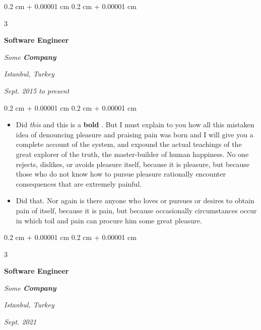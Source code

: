 \documentclass[10pt, letterpaper]{article}
\newenvironment{highlights}{
    \begin{itemize}[
        topsep=0.10 cm,
        parsep=0.10 cm,
        partopsep=0pt,
        itemsep=0pt,
        leftmargin=0.4 cm + 10pt + 0.6 cm
    ]
}{
    \end{itemize}
} %
\newenvironment{onecolentry}{
    \begin{adjustwidth}{
        0.2 cm + 0.00001 cm
    }{
        0.2 cm + 0.00001 cm
    }
}{
    \end{adjustwidth}
} %
\newenvironment{threecolentry}[3][]{
    \onecolentry
    \def\thirdColumn{#3}
    \setcolumnwidth{0.6 cm, \fill, 4.5 cm}
    \begin{paracol}{3}
    #2 \switchcolumn
}{
    \switchcolumn \raggedleft \thirdColumn
    \end{paracol}
    \endonecolentry
} %
\let\hrefWithoutArrow\href
\renewcommand{\href}[2]{\hrefWithoutArrow{#1}{\mbox{\ifthenelse{\equal{#2}{}}{ }{#2 }\raisebox{.15ex}{\footnotesize \faExternalLink*}}}}
\begin{document}
        \vspace{0.2 cm-3px}

        \begin{threecolentry}{
            \vspace*{\fill}
            \textbullet
            \vspace*{3px}
            \vspace*{\fill}
        }{
        \textit{Istanbul, Turkey}    
            
        \textit{Sept. 2015 to present}}
            \textbf{Software Engineer}
            
            \textit{Some \textbf{Company}}
        \end{threecolentry}

        \vspace{0.10 cm-3px}
        \begin{onecolentry}
            \begin{highlights}
                \item Did \textit{this} and this is a \textbf{bold} \href{https://example.com}{link}. But I must explain to you how all this mistaken idea of denouncing pleasure and praising pain was born and I will give you a complete account of the system, and expound the actual teachings of the great explorer of the truth, the master-builder of human happiness. No one rejects, dislikes, or avoids pleasure itself, because it is pleasure, but because those who do not know how to pursue pleasure rationally encounter consequences that are extremely painful.
                \item Did that. Nor again is there anyone who loves or pursues or desires to obtain pain of itself, because it is pain, but because occasionally circumstances occur in which toil and pain can procure him some great pleasure.
            \end{highlights}
        \end{onecolentry}


        \vspace{0.2 cm-3px}

        \begin{threecolentry}{
            \vspace*{\fill}
            \textbullet
            \vspace*{3px}
            \vspace*{\fill}
        }{
        \textit{Istanbul, Turkey}    
            
        \textit{Sept. 2021}}
            \textbf{Software Engineer}
            
            \textit{Some \textbf{Company}}
        \end{threecolentry}
\end{document}
